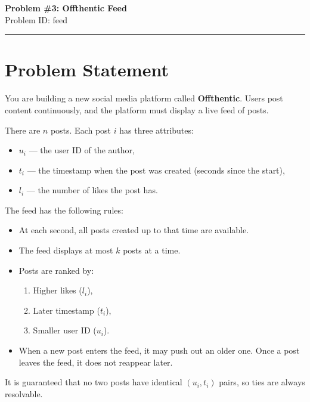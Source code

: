 \documentclass[12pt,a4paper]{article}
\begin{document}
\ifdefined\BOOKLET
  \pagestyle{empty}
\fi

\begin{center}
    {\LARGE \textbf{Problem \#3: Offthentic Feed}} \\[0.5em]
    {Problem ID: feed} \\[1em]
    \rule{\textwidth}{0.4pt}
\end{center}

\vspace{1em}

\section*{Problem Statement}
You are building a new social media platform called \textbf{Offthentic}. Users post content continuously, and the platform must display a live feed of posts.  

There are $n$ posts. Each post $i$ has three attributes:
\begin{itemize}
    \item $u_i$ — the user ID of the author,  
    \item $t_i$ — the timestamp when the post was created (seconds since the start),  
    \item $l_i$ — the number of likes the post has.  
\end{itemize}

The feed has the following rules:
\begin{itemize}
    \item At each second, all posts created up to that time are available.  
    \item The feed displays at most $k$ posts at a time.  
    \item Posts are ranked by:
        \begin{enumerate}
            \item Higher likes ($l_i$),  
            \item Later timestamp ($t_i$),  
            \item Smaller user ID ($u_i$).  
        \end{enumerate}
    \item When a new post enters the feed, it may push out an older one. Once a post leaves the feed, it does not reappear later.  
\end{itemize}

It is guaranteed that no two posts have identical $(u_i, t_i)$ pairs, so ties are always resolvable.  
\end{document}
